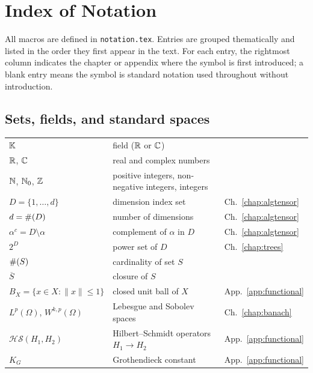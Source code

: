 %

\chapter{Index of Notation}
\label{app:notation_index}

All macros are defined in \texttt{notation.tex}. Entries are grouped
thematically and listed in the order they first appear in the text.
For each entry, the rightmost column indicates the chapter or appendix
where the symbol is first introduced; a blank entry means the symbol
is standard notation used throughout without introduction.

\section*{Sets, fields, and standard spaces}

\begin{tabular}{@{}p{4.5cm}p{7cm}l@{}}
$\mathbb{K}$ & field ($\mathbb{R}$ or $\mathbb{C}$) & \\
$\mathbb{R}$, $\mathbb{C}$ & real and complex numbers & \\
$\mathbb{N}$, $\mathbb{N}_0$, $\mathbb{Z}$ & positive integers, non-negative integers,
    integers & \\
$D = \{1,\ldots,d\}$ & dimension index set & Ch.~\ref{chap:algtensor} \\
$d = \#(D)$ & number of dimensions & Ch.~\ref{chap:algtensor} \\
$\alpha^c = D \setminus \alpha$ & complement of $\alpha$ in $D$
    & Ch.~\ref{chap:algtensor} \\
$2^D$ & power set of $D$ & Ch.~\ref{chap:trees} \\
$\#(S)$ & cardinality of set $S$ & \\
$\overline{S}$ & closure of $S$ & \\
$B_X = \{x \in X : \|x\| \leq 1\}$ & closed unit ball of $X$
    & App.~\ref{app:functional} \\
$L^p(\Omega)$, $W^{k,p}(\Omega)$ & Lebesgue and Sobolev spaces
    & Ch.~\ref{chap:banach} \\
$\mathcal{HS}(H_1, H_2)$ & Hilbert--Schmidt operators $H_1 \to H_2$
    & App.~\ref{app:functional} \\
$K_G$ & Grothendieck constant & App.~\ref{app:functional} \\
\end{tabular}

